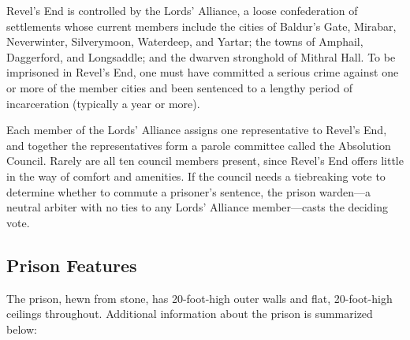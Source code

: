 \documentclass[10pt,a4paper,twoside,bg=print,twocolumn,openany,nodeprecatedcode]{dndbook}
\begin{document}
Revel's End is controlled by the Lords' Alliance, a loose confederation of settlements whose current members include the cities of Baldur's Gate, Mirabar, Neverwinter, Silverymoon, Waterdeep, and Yartar; the towns of Amphail, Daggerford, and Longsaddle; and the dwarven stronghold of Mithral Hall. To be imprisoned in Revel's End, one must have committed a serious crime against one or more of the member cities and been sentenced to a lengthy period of incarceration (typically a year or more).

Each member of the Lords' Alliance assigns one representative to Revel's End, and together the representatives form a parole committee called the Absolution Council. Rarely are all ten council members present, since Revel's End offers little in the way of comfort and amenities. If the council needs a tiebreaking vote to determine whether to commute a prisoner's sentence, the prison warden—a neutral arbiter with no ties to any Lords' Alliance member—casts the deciding vote.

\subsection{Prison Features}
The prison, hewn from stone, has 20-foot-high outer walls and flat, 20-foot-high ceilings throughout. Additional information about the prison is summarized below:
\end{document}
